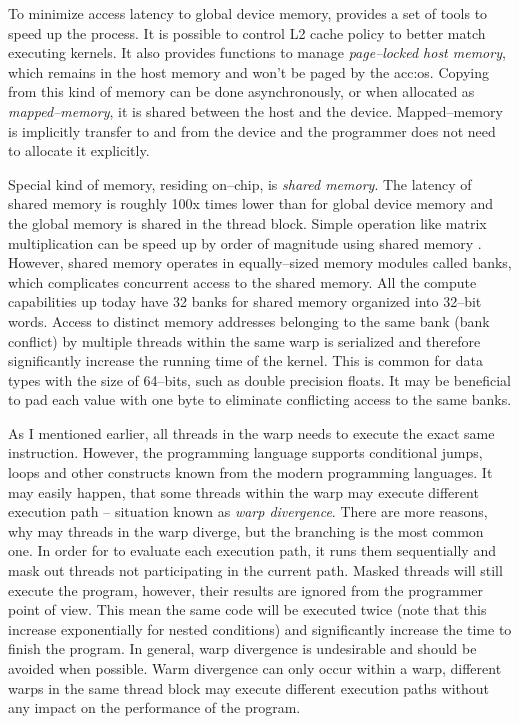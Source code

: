 To minimize access latency to global device memory, \cuda provides a set of tools to speed up the process. It is possible to control L2 cache policy to better match executing kernels. It also provides functions to manage \emph{page--locked host memory}, which remains in the host memory and won't be paged by the \acrshort{acc:os}. Copying from this kind of memory can be done asynchronously, or when allocated as \emph{mapped--memory}, it is shared between the host and the device. Mapped--memory is implicitly transfer to and from the device and the programmer does not need to allocate it explicitly.

Special kind of memory, residing on--chip, is \emph{shared memory}. The latency of shared memory is roughly 100x times lower than for global device memory and the global memory is shared in the thread block. Simple operation like matrix multiplication can be speed up by order of magnitude using shared memory \citep{MatrixMultiplicationGPU}. However, shared memory operates in equally--sized memory modules called banks, which complicates concurrent access to the shared memory. All the compute capabilities up today have 32 banks for shared memory organized into 32--bit words. Access to distinct memory addresses belonging to the same bank (bank conflict) by multiple threads within the same warp is serialized and therefore significantly increase the running time of the kernel. This is common for data types with the size of 64--bits, such as double precision floats. It may be beneficial to pad each value with one byte to eliminate conflicting access to the same banks.

As I mentioned earlier, all threads in the warp needs to execute the exact same instruction. However, the programming language supports conditional jumps, loops and other constructs known from the modern programming languages. It may easily happen, that some threads within the warp may execute different execution path -- situation known as \emph{warp divergence}. There are more reasons, why may threads in the warp diverge, but the branching is the most common one. In order for \gpu to evaluate each execution path, it runs them sequentially and mask out threads not participating in the current path. Masked threads will still execute the program, however, their results are ignored from the programmer point of view. This mean the same code will be executed twice (note that this increase exponentially for nested conditions) and significantly increase the time to finish the program. In general, warp divergence is undesirable and should be avoided when possible.
Warm divergence can only occur within a warp, different warps in the same thread block may execute different execution paths without any impact on the performance of the program.

